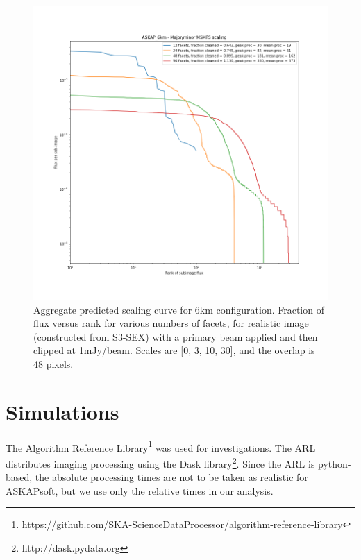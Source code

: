 \documentclass[11pt,a4paper,variablewidth]{article}
\begin{document}
\begin{figure}[H]
  \centering
  \includegraphics[width=\textwidth]{./aggregate_scaling_ASKAP_6km.png}
  \caption{Aggregate predicted scaling curve for 6km configuration. Fraction of flux versus rank for various numbers of facets, for realistic image (constructed from S3-SEX) with a primary beam applied and then clipped at 1mJy/beam. Scales are [0, 3, 10, 30], and the overlap is 48 pixels.}
  \label{fig:aggregate_scaling_6km}
\end{figure}

\pagebreak
\section{Simulations}
\label{sec:simulations}

The Algorithm Reference Library\footnote{https://github.com/SKA-ScienceDataProcessor/algorithm-reference-library} was used for investigations. The ARL distributes imaging processing using the Dask library\footnote{http://dask.pydata.org}. Since the ARL is python-based, the absolute processing times are not to be taken as realistic for ASKAPsoft, but we use only the relative times in our analysis. 
	
\end{document}
